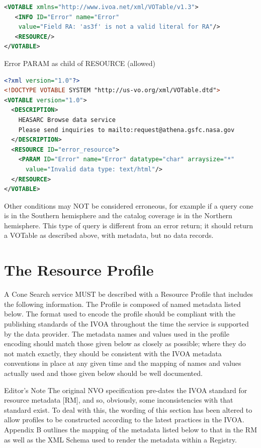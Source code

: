 \documentclass[11pt,a4paper]{ivoa}
\begin{document}
\begin{enumerate}
\begin{bigdescription}
			\begin{lstlisting}[language=XML,basicstyle=\footnotesize]			
<VOTABLE xmlns="http://www.ivoa.net/xml/VOTable/v1.3">
   <INFO ID="Error" name="Error" 
    value="Field RA: 'as3f' is not a valid literal for RA"/>
   <RESOURCE/>
</VOTABLE> 
			\end{lstlisting}
			
			Error PARAM as child of RESOURCE (allowed)
			
			\begin{lstlisting}[language=XML,basicstyle=\footnotesize]
<?xml version="1.0"?>
<!DOCTYPE VOTABLE SYSTEM "http://us-vo.org/xml/VOTable.dtd">
<VOTABLE version="1.0">
  <DESCRIPTION>
    HEASARC Browse data service
    Please send inquiries to mailto:request@athena.gsfc.nasa.gov
  </DESCRIPTION>
  <RESOURCE ID="error_resource">
    <PARAM ID="Error" name="Error" datatype="char" arraysize="*"
      value="Invalid data type: text/html"/>
  </RESOURCE>
</VOTABLE>
			\end{lstlisting}
		
		\end{bigdescription}
		
		Other conditions may
		NOT be considered erroneous, for example if a query cone is in the
		Southern hemisphere and the catalog coverage is in the Northern
		hemisphere. This type of query is different from an error return; it
		should return a VOTable as described above, with metadata, but no data
		records.
\end{enumerate}

\section{The Resource Profile}
\label{sec:3} 

A Cone Search service MUST
be described with a Resource Profile that includes the following
information. The Profile is composed of named metadata listed below. The
format used to encode the profile should be compliant with the
publishing standards of the IVOA throughout the time the service is
supported by the data provider. The metadata names and values used in
the profile encoding should match those given below as closely as
possible; where they do not match exactly, they should be consistent
with the IVOA metadata conventions in place at any given time and the
mapping of names and values actually used and those given below should
be well documented.

\begin{bigdescription}
	\item[Editor's Note] 
		The original NVO specification pre-dates the IVOA standard for resource
		metadata [RM], and so, obviously, some inconsistencies with that
		standard exist. To deal with this, the wording of this section has been
		altered to allow profiles to be constructed according to the latest
		practices in the IVOA. Appendix B outlines the mapping of the metadata
		listed below to that in the RM as well as the XML Schema used to render
		the metadata within a Registry.
\end{bigdescription}
\end{document}
